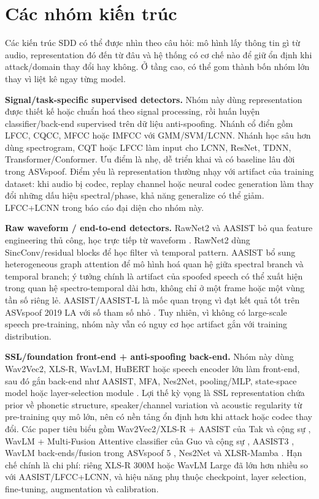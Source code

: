 \section{Các nhóm kiến trúc} \label{sec:architectures}

Các kiến trúc SDD có thể được nhìn theo câu hỏi: mô hình lấy thông tin gì từ audio, representation đó đến từ đâu và hệ thống có cơ chế nào để giữ ổn định khi attack/domain thay đổi hay không. Ở tầng cao, có thể gom thành bốn nhóm lớn thay vì liệt kê ngay từng model.

\textbf{Signal/task-specific supervised detectors.} Nhóm này dùng representation được thiết kế hoặc chuẩn hoá theo signal processing, rồi huấn luyện classifier/back-end supervised trên dữ liệu anti-spoofing. Nhánh cổ điển gồm LFCC, CQCC, MFCC hoặc IMFCC với GMM/SVM/LCNN. Nhánh học sâu hơn dùng spectrogram, CQT hoặc LFCC làm input cho LCNN, ResNet, TDNN, Transformer/Conformer. Ưu điểm là nhẹ, dễ triển khai và có baseline lâu đời trong ASVspoof. Điểm yếu là representation thường nhạy với artifact của training dataset: khi audio bị codec, replay channel hoặc neural codec generation làm thay đổi những dấu hiệu spectral/phase, khả năng generalize có thể giảm. LFCC+LCNN trong báo cáo đại diện cho nhóm này.

\textbf{Raw waveform / end-to-end detectors.} RawNet2 và AASIST bỏ qua feature engineering thủ công, học trực tiếp từ waveform \cite{rawnet2,aasist}. RawNet2 dùng SincConv/residual blocks để học filter và temporal pattern. AASIST bổ sung heterogeneous graph attention để mô hình hoá quan hệ giữa spectral branch và temporal branch; ý tưởng chính là artifact của spoofed speech có thể xuất hiện trong quan hệ spectro-temporal dài hơn, không chỉ ở một frame hoặc một vùng tần số riêng lẻ. AASIST/AASIST-L là mốc quan trọng vì đạt kết quả tốt trên ASVspoof 2019 LA với số tham số nhỏ \cite{aasist}. Tuy nhiên, vì không có large-scale speech pre-training, nhóm này vẫn có nguy cơ học artifact gắn với training distribution.

\textbf{SSL/foundation front-end + anti-spoofing back-end.} Nhóm này dùng Wav2Vec2, XLS-R, WavLM, HuBERT hoặc speech encoder lớn làm front-end, sau đó gắn back-end như AASIST, MFA, Nes2Net, pooling/MLP, state-space model hoặc layer-selection module \cite{wav2vec2,xlsr,wavlm}. Lợi thế kỳ vọng là SSL representation chứa prior về phonetic structure, speaker/channel variation và acoustic regularity từ pre-training quy mô lớn, nên có nền tảng ổn định hơn khi attack hoặc codec thay đổi. Các paper tiêu biểu gồm Wav2Vec2/XLS-R + AASIST của Tak và cộng sự \cite{ssl_aasist}, WavLM + Multi-Fusion Attentive classifier của Guo và cộng sự \cite{wavlm_mfa}, AASIST3 \cite{aasist3}, WavLM back-ends/fusion trong ASVspoof 5 \cite{wavlm_backend,wavlm_ensemble}, Nes2Net \cite{nes2net} và XLSR-Mamba \cite{xlsr_mamba}. Hạn chế chính là chi phí: riêng XLS-R 300M hoặc WavLM Large đã lớn hơn nhiều so với AASIST/LFCC+LCNN, và hiệu năng phụ thuộc checkpoint, layer selection, fine-tuning, augmentation và calibration.

